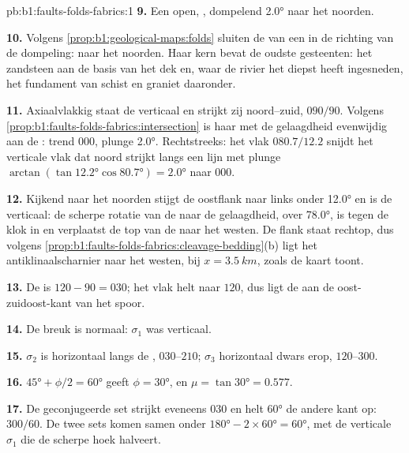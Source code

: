 \begin{solution}{pb:b1:faults-folds-fabrics:1}
\textbf{9.} Een open, , dompelend \ang{2.0} naar het noorden.

\textbf{10.} Volgens \cref{prop:b1:geological-maps:folds} sluiten de  van een
 in de richting van de dompeling: naar het noorden. Haar kern bevat de
oudste gesteenten: het zandsteen aan de basis van het dek en, waar de rivier het diepst
heeft ingesneden, het fundament van schist en graniet daaronder.

\textbf{11.} Axiaalvlakkig staat de  verticaal en strijkt zij noord--zuid,
$090/90$. Volgens \cref{prop:b1:faults-folds-fabrics:intersection} is haar 
met de gelaagdheid evenwijdig aan de : trend
$000$, plunge \ang{2.0}. Rechtstreeks: het vlak $080.7/12.2$ snijdt het verticale vlak dat noord strijkt langs een lijn met plunge $\arctan(\tan\ang{12.2}
\cos\ang{80.7}) = \ang{2.0}$ naar $000$.

\textbf{12.} Kijkend naar het noorden stijgt de oostflank naar links onder \ang{12.0}
en is de  verticaal: de scherpe rotatie van de  naar de
gelaagdheid, over \ang{78.0}, is tegen de klok in en verplaatst de top van de
 naar het westen. De flank staat rechtop, dus volgens
\cref{prop:b1:faults-folds-fabrics:cleavage-bedding}(b) ligt het antiklinaalscharnier
naar het westen, bij $x = \qty{3.5}{km}$, zoals de kaart toont.

\textbf{13.} De  is $120 - 90 = 030$; het vlak helt naar $120$, dus
ligt de  aan de oost-zuidoost-kant van het spoor.

\textbf{14.} De breuk is normaal: $\sigma_1$ was verticaal.

\textbf{15.} $\sigma_2$ is horizontaal langs de , $030$--$210$;
$\sigma_3$ horizontaal dwars erop, $120$--$300$.

\textbf{16.} $\ang{45} + \phi/2 = \ang{60}$ geeft $\phi = \ang{30}$, en
$\mu = \tan\ang{30} = 0.577$.

\textbf{17.} De geconjugeerde set strijkt eveneens $030$ en helt \ang{60} de andere kant op: $300/60$. De twee sets komen samen onder $\ang{180} - 2\times\ang{60} = \ang{60}$,
met de verticale $\sigma_1$ die de scherpe hoek halveert.


\end{solution}
